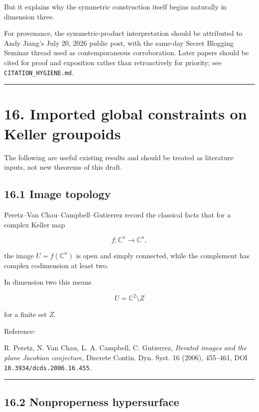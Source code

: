 But it explains why the symmetric construction itself begins naturally
in dimension three.

For provenance, the symmetric-product interpretation should be
attributed to Andy Jiang's July 20, 2026 public post, with the same-day
Secret Blogging Seminar thread used as contemporaneous corroboration.
Later papers should be cited for proof and exposition rather than
retroactively for priority; see \texttt{CITATION\_HYGIENE.md}.

\begin{center}\rule{0.5\linewidth}{0.5pt}\end{center}

\section{16. Imported global constraints on Keller
groupoids}\label{imported-global-constraints-on-keller-groupoids}

The following are useful existing results and should be treated as
literature inputs, not new theorems of this draft.

\subsection{16.1 Image topology}\label{image-topology}

Peretz--Van Chau--Campbell--Gutierrez record the classical facts that
for a complex Keller map

\[
f\colon\mathbb C^n\to\mathbb C^n,
\]

the image \(U=f(\mathbb C^n)\) is open and simply connected, while the
complement has complex codimension at least two.

In dimension two this means

\[
U=\mathbb C^2\setminus Z
\]

for a finite set \(Z\).

Reference:

R. Peretz, N. Van Chau, L. A. Campbell, C. Gutierrez, \emph{Iterated
images and the plane Jacobian conjecture}, Discrete Contin. Dyn. Syst.
16 (2006), 455--461, DOI \texttt{10.3934/dcds.2006.16.455}.

\begin{center}\rule{0.5\linewidth}{0.5pt}\end{center}

\subsection{16.2 Nonproperness
hypersurface}\label{nonproperness-hypersurface}


